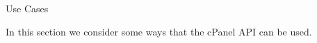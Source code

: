 
\begin{section}{Use Cases}

In this section we consider some ways that the cPanel API can be used.

\end{section}
